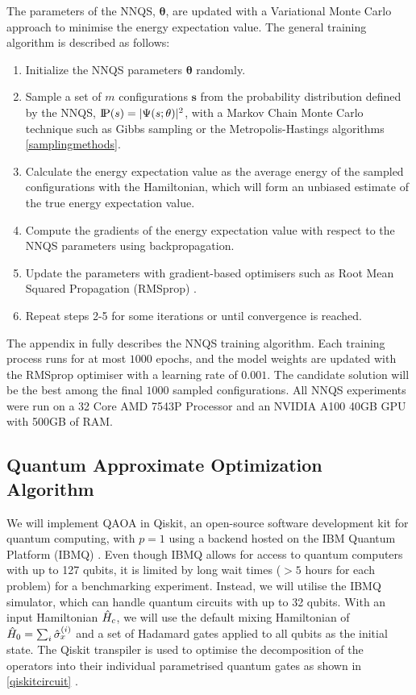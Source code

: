 The parameters of the NNQS, $\mathbf{\theta}$, are updated with a Variational Monte Carlo approach to minimise the energy expectation value. The general training algorithm is described as follows:
\begin{enumerate}
    \item Initialize the NNQS parameters $\mathbf{\theta}$ randomly.
    \item Sample a set of $m$ configurations $\mathbf{s}$ from the probability distribution defined by the NNQS, $\text{I\kern-0.15em P}(s) = |\Psi(s;\theta)|^2$, with a Markov Chain Monte Carlo technique such as Gibbs sampling or the Metropolis-Hastings algorithms \autoref{samplingmethods}.
    \item Calculate the energy expectation value as the average energy of the sampled configurations with the Hamiltonian, which will form an unbiased estimate of the true energy expectation value.
    \item Compute the gradients of the energy expectation value with respect to the NNQS parameters using backpropagation.
    \item Update the parameters with gradient-based optimisers such as Root Mean Squared Propagation (RMSprop) \cite{rmsprop}.
    \item Repeat steps 2-5 for some iterations or until convergence is reached.
\end{enumerate}
The appendix in \cite{b20} fully describes the NNQS training algorithm. Each training process runs for at most $1000$ epochs, and the model weights are updated with the RMSprop optimiser with a learning rate of $0.001$. The candidate solution will be the best among the final $1000$ sampled configurations. All NNQS experiments were run on a 32 Core AMD 7543P Processor and an NVIDIA A100 40GB GPU with 500GB of RAM.

\subsection{Quantum Approximate Optimization Algorithm}
We will implement QAOA in Qiskit, an open-source software development kit for quantum computing, with $p=1$ using a backend hosted on the IBM Quantum Platform (IBMQ) \cite{b24}. Even though IBMQ allows for access to quantum computers with up to 127 qubits, it is limited by long wait times ($>5$ hours for each problem) for a benchmarking experiment. Instead, we will utilise the IBMQ simulator, which can handle quantum circuits with up to 32 qubits. With an input Hamiltonian $\Hat{H}_c$, we will use the default mixing Hamiltonian of $\Hat{H}_0 = \sum_{i}\Hat{\sigma}_x^{(i)}$ and a set of Hadamard gates applied to all qubits as the initial state. The Qiskit transpiler is used to optimise the decomposition of the operators into their individual parametrised quantum gates as shown in \autoref{qiskitcircuit} \cite{qiskittranspiler}.

